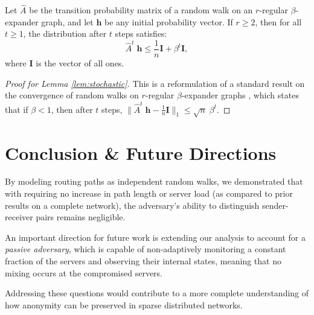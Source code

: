 \begin{lemma} \label{lem:stochastic}
Let $\hat{A}$ be the transition probability matrix of a random walk on an $r$-regular $\beta$-expander graph, and let $\mathbf{h}$ be any initial probability vector. If $r \geq 2$, then for all $t \geq 1$, the distribution after $t$ steps satisfies:
$$
\hat{A}^t \; \mathbf{h} \leq \frac{1}{n} \mathbf{I} + \beta^t \mathbf{I},
$$
where $\mathbf{I}$ is the vector of all ones.
\end{lemma}
\begin{proof} [Proof for Lemma \ref{lem:stochastic}]
This is a reformulation of a standard result on the convergence of random walks on $r$-regular $\beta$-expander graphs \cite[Theorem 3.2]{Hoory2006}, which states that if $\beta < 1$, then after $t$ steps, $\|\hat{A}^t \; \mathbf{h} - \frac{1}{n} \mathbf{I}\|_1 \leq \sqrt{n} \; \beta^t$. 
\end{proof}

\section{Conclusion \& Future Directions}

By modeling routing paths as independent random walks, we demonstrated that with requiring no increase in path length or server load (as compared to prior results on a complete network), the adversary’s ability to distinguish sender-receiver pairs remains negligible. 

An important direction for future work is extending our analysis to account for a \textit{passive adversary}, which is capable of non-adaptively monitoring a constant fraction of the servers and observing their internal states, meaning that no mixing occurs at the compromised servers. 

Addressing these questions would contribute to a more complete understanding of how anonymity can be preserved in sparse distributed networks.

%
%

 

\appendix 


